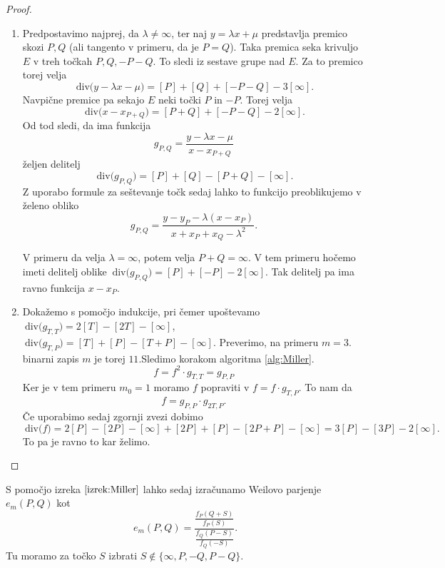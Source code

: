 \documentclass[12pt,a4paper,twoside]{article}
\theoremstyle{definition} %
\theoremstyle{plain} %
\numberwithin{equation}{section}  %
\newcommand{\Div}[1]{\ \text{div(}{#1}\text{)}}
\begin{document}
\begin{proof}~

\begin{enumerate}
\item Predpostavimo najprej, da $\lambda \neq \infty$, ter naj $y = \lambda x + \mu$ predstavlja premico skozi $P,Q$ (ali tangento v primeru, da je $P=Q$). Taka premica seka krivuljo $E$ v treh točkah $P,Q,-P-Q$. To sledi iz sestave grupe nad $E$. Za to premico torej velja
$$\Div{y-\lambda x - \mu} = [P] + [Q] + [-P-Q] - 3[\infty].$$
Navpične premice pa sekajo $E$ neki točki $P$ in $-P$. Torej velja
$$\Div{x-x_{P+Q}} = [P+Q] + [-P-Q] - 2[\infty].$$
Od tod sledi, da ima funkcija
$$g_{P,Q} =\frac{y-\lambda x - \mu}{x-x_{P+Q}}$$
željen delitelj
$$\Div{g_{P,Q}} = [P] + [Q] - [P+Q] - [\infty].$$
Z uporabo formule za seštevanje točk sedaj lahko to funkcijo preoblikujemo v želeno obliko
$$g_{P,Q} = \frac{y-y_P-\lambda(x-x_P)}{x+x_P+x_Q-\lambda^2} .$$

V primeru da velja $\lambda = \infty$, potem velja $P+Q = \infty$. V tem primeru hočemo imeti delitelj oblike $\Div{g_{P,Q}} = [P] + [-P] - 2[\infty]$. Tak delitelj pa ima ravno funkcija $x-x_P$.

\item Dokažemo s pomočjo indukcije, pri čemer upoštevamo $\Div{g_{T,T}} = 2[T]-[2T]-[\infty]$, $\Div{g_{T,P}} = [T]+[P]-[T+P]-[\infty]$.
Preverimo, na primeru $m = 3$. binarni zapis $m$ je torej $11$.Sledimo korakom algoritma \ref{alg:Miller}.
$$f = f^2 \cdot g_{T,T} = g_{P,P}$$
Ker je v tem primeru $m_0 = 1$ moramo $f$ popraviti v $f = f \cdot g_{T,P}$. To nam da
$$f = g_{P,P} \cdot g_{2T,P}.$$
Če uporabimo sedaj zgornji zvezi dobimo
$$\Div{f} = 2[P] - [2P] - [\infty] + [2P] + [P] - [2P+P] - [\infty] = 3[P] - [3P]-2[\infty].$$
To pa je ravno to kar želimo.

\end{enumerate}

\end{proof}

S pomočjo izreka $\ref{izrek:Miller}$ lahko sedaj izračunamo Weilovo parjenje $e_m(P,Q)$ kot
$$e_m(P,Q) = \frac{\frac{f_P(Q+S)}{f_P(S)}}{\frac{f_Q(P-S)}{f_Q(-S)}} .$$
Tu moramo za točko $S$ izbrati $S \notin \{ \infty,P,-Q,P-Q\}$.
\end{document}
